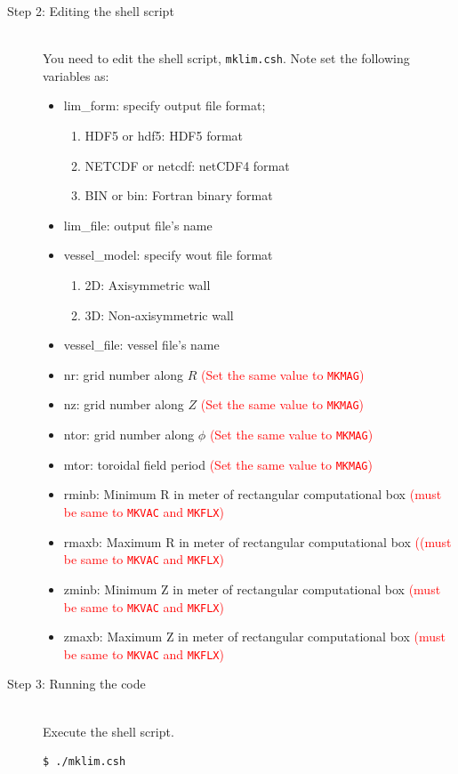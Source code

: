 \documentclass[10pt]{ltxdoc} %
\begin{document}
\begin{description}
  
 \item[Step 2: Editing the shell script]\mbox{}\\
  You need to edit the shell script, \texttt{mklim.csh}. Note set the following variables as:
   \begin{itemize}
    \item lim\_form: specify output file format;
     \begin{enumerate}
      \item HDF5 or hdf5: HDF5 format
      \item NETCDF or netcdf: netCDF4 format
      \item BIN or bin: Fortran binary format
     \end{enumerate}
    \item lim\_file: output file's name
    \item vessel\_model: specify wout file format
     \begin{enumerate}
      \item 2D: Axisymmetric wall
      \item 3D: Non-axisymmetric wall
     \end{enumerate}
    \item vessel\_file: vessel file's name
    \item nr: grid number along $R$ \textcolor{red}{(Set the same value to \texttt{MKMAG})}
    \item nz: grid number along $Z$ \textcolor{red}{(Set the same value to \texttt{MKMAG})}
    \item ntor: grid number along $\phi$ \textcolor{red}{(Set the same value to \texttt{MKMAG})}
    \item mtor: toroidal field period \textcolor{red}{(Set the same value to \texttt{MKMAG})}
    \item rminb: Minimum R in meter of rectangular computational box \textcolor{red}{(must be same to \texttt{MKVAC} and \texttt{MKFLX})}
    \item rmaxb: Maximum R in meter of rectangular computational box \textcolor{red}{((must be same to \texttt{MKVAC} and \texttt{MKFLX})}
    \item zminb: Minimum Z in meter of rectangular computational box \textcolor{red}{(must be same to \texttt{MKVAC} and \texttt{MKFLX})}
    \item zmaxb: Maximum Z in meter of rectangular computational box \textcolor{red}{(must be same to \texttt{MKVAC} and \texttt{MKFLX})}
   \end{itemize}

 \item[Step 3: Running the code]\mbox{}\\
  Execute the shell script.
\vspace{-2mm}
\begin{verbatim}
$ ./mklim.csh
\end{verbatim}
\vspace{-2mm}
\end{description}
\end{document}
